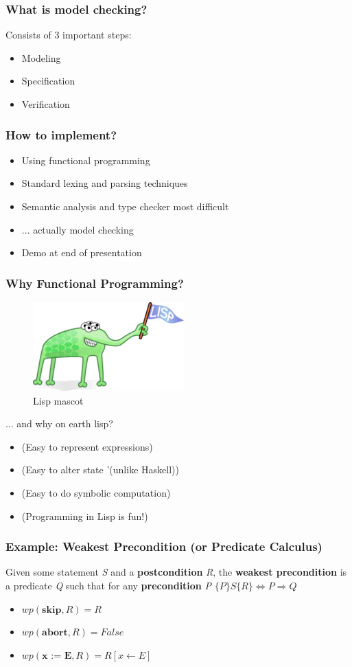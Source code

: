 \documentclass{beamer}
\begin{document}
\begin{frame}
  \frametitle{What is model checking?}
  Consists of 3 important steps:
  \begin{itemize}
  \item Modeling
  \item Specification
  \item Verification
  \end{itemize}
\end{frame}

\begin{frame}
  \frametitle{How to implement?}
  \begin{itemize}
  \item Using functional programming
  \item Standard lexing and parsing techniques
  \item Semantic analysis and type checker most difficult
  \item ... actually model checking
  \item Demo at end of presentation
  \end{itemize}
\end{frame}

\begin{frame}
  \frametitle{Why Functional Programming?}
  \begin{figure}
    \centering
    \includegraphics[scale=0.45]{lisp.png}
    \caption{Lisp mascot}
    \label{fig:enter-label}
  \end{figure}
  ... and why on earth lisp?
  \begin{itemize}
  \item (Easy to represent expressions)
  \item (Easy to alter state '(unlike Haskell))
  \item (Easy to do symbolic computation)
  \item (Programming in Lisp is fun!)
  \end{itemize}
\end{frame}

\begin{frame}
  \frametitle{Example: Weakest Precondition (or Predicate Calculus)}
  Given some statement \textit{S} and a \textbf{postcondition} \textit{R},
  the \textbf{weakest precondition} is a predicate \textit{Q} such that for
  any \textbf{precondition} \textit{P} \( \{P\} S \{R\} \Longleftrightarrow P \Rightarrow Q \)
  \begin{itemize}
  \item \(wp(\textbf{skip}, R) = R\)
  \item \(wp(\textbf{abort}, R) = False\)
  \item \(wp(\textbf{x := E}, R) = R[x \leftarrow E] \)    
  \end{itemize}
\end{frame}

\end{document}
